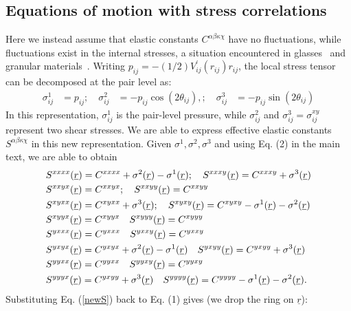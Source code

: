 \documentclass[twoside,twocolumn,9pt]{article}
\begin{document}


\begin{appendix}
\section{Equations of motion with stress correlations}
Here we instead assume that elastic constants $C^{\alpha\beta\kappa\chi}$ have no fluctuations, while fluctuations exist in the internal stresses, a situation encountered in glasses~\cite{Maier2018} and granular materials~\cite{Jie2020}. Writing $p_{ij}=-(1/2)V_{ij}^\prime(r_{ij})r_{ij}$, the local stress tensor can be decomposed at the pair level as:
\begin{align}
\sigma_{ij}^1&=p_{ij};\quad \sigma_{ij}^2&=-p_{ij}\cos(2\theta_{ij}),;\quad \sigma_{ij}^3&=-p_{ij}\sin(2\theta_{ij})
\end{align}
In this representation, $\sigma_{ij}^1$ is the pair-level pressure, while $\sigma_{ij}^2$ and $\sigma_{ij}^3=\sigma_{ij}^{xy}$ represent two shear stresses. We are able to express effective elastic constants $S^{\alpha\beta\kappa\chi}$ in this new representation. Given $\sigma^1,\sigma^2,\sigma^3$ and using Eq. (2) in the main text, we are able to obtain
\begin{align}
&S^{xxxx}(\underline{r})=C^{xxxx}+\sigma^2(\underline{r})-\sigma^1(\underline{r});\quad S^{xxxy}(\underline{r})=C^{xxxy}+\sigma^3(\underline{r})\notag\\
&S^{xxyx}(\underline{r})=C^{xxyx};\quad
S^{xxyy}(\underline{r})=C^{xxyy}\notag\\
&S^{xyxx}(\underline{r})=C^{xyxx}+\sigma^3(\underline{r});\quad
S^{xyxy}(\underline{r})=C^{xyxy}-\sigma^1(\underline{r})-\sigma^2(\underline{r})\notag\\
&S^{xyyx}(\underline{r})=C^{xyyx}\quad S^{xyyy}(\underline{r})=C^{xyyy}\notag\\
&S^{yxxx}(\underline{r})=C^{yxxx}\quad S^{yxxy}(\underline{r})=C^{yxxy}\notag\\
&S^{yxyx}(\underline{r})=C^{yxyx}+\sigma^2(\underline{r})-\sigma^1(\underline{r})\quad S^{yxyy}(\underline{r})=C^{yxyy}+\sigma^3(\underline{r})\notag\\
&S^{yyxx}(\underline{r})=C^{yyxx}\quad S^{yyxy}(\underline{r})=C^{yyxy}\notag\\
&S^{yyyx}(\underline{r})=C^{yxyy}+\sigma^3(\underline{r})\quad S^{yyyy}(\underline{r})=C^{yyyy}-\sigma^1(\underline{r})-\sigma^2(\underline{r}).
\label{newS}
\end{align}
Substituting Eq. (\ref{newS}) back to Eq. (1) gives (we drop the ring on $\underline{r}$):

\end{appendix}
\end{document}
